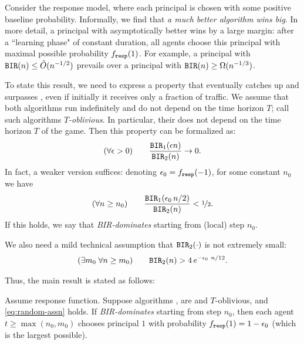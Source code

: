 Consider the \HardMaxRandom response model, where each principal is chosen with some positive baseline probability. Informally, we find that
\emph{a much better algorithm wins big}.
In more detail, a principal with asymptotically better \BIR wins by a large margin: after a ``learning phase" of constant duration, all agents choose this principal with maximal possible probability $f_{\mathtt{resp}}(1)$. For example, a principal with $\mathtt{BIR}(n)\leq \tilde{O}(n^{-1/2})$ prevails over a principal with $\mathtt{BIR}(n)\geq \Omega(n^{-1/3})$.



To state this result, we need to express a property that \alg[1] eventually catches up and surpasses \alg[2], even if initially it receives only a fraction of traffic. We assume that both algorithms run indefinitely and do not depend on the time horizon $T$; call such algorithms \emph{$T$-oblivious}. In particular, their \BIR does not depend on the time horizon $T$ of the game.  Then this property can be formalized as:
\begin{align}\label{eq:random-better-clean}
(\forall \epsilon>0)\qquad
\frac{\mathtt{BIR}_1(\epsilon n)}{\mathtt{BIR}_2(n)} \to 0.
\end{align}
In fact, a weaker version suffices:
denoting $\epsilon_0 = f_{\mathtt{resp}}(-1)$, for some constant $n_0$ we have
\begin{align}\label{eq:random-better-weaker}
(\forall n\geq n_0) \qquad
\frac{\mathtt{BIR}_1(\epsilon_0\, n/2)}{\mathtt{BIR}_2(n)} <\nicefrac12.
\end{align}
If this holds, we say that \alg[1] \emph{BIR-dominates} \alg[2] starting from (local) step $n_0$.

We also need a mild technical assumption that $\mathtt{BIR}_2(\cdot)$ is not extremely small:
\begin{align}\label{eq:random-assn}
 (\exists m_0\;\forall n\geq m_0) \qquad
  \mathtt{BIR}_2(n) > 4\,e^{-\epsilon_0\ n/12}.
\end{align}

Thus, the main result is stated as follows:

\begin{theorem}\label{thm:random-clean}
Assume \HardMaxRandom response function. Suppose algorithms \alg[1], \alg[2] are \bmonotone and $T$-oblivious, and \eqref{eq:random-assn} holds. If \alg[1] \emph{BIR-dominates} \alg[2] starting from step $n_0$, then each agent $t\geq \max(n_0,m_0)$ chooses principal $1$ with probability $f_{\mathtt{resp}}(1) = 1- \epsilon_0$ (which is the largest possible).
\end{theorem}





